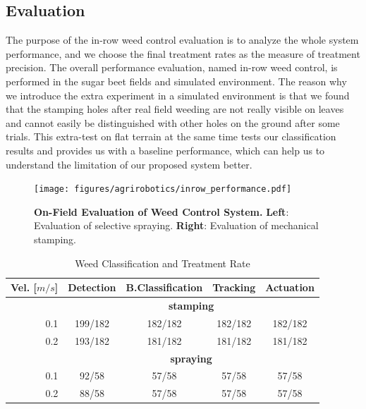 \subsection{Evaluation}

The purpose of the in-row weed control evaluation is to analyze the whole system performance, and we choose the final treatment rates as the measure of treatment precision. The overall performance evaluation, named in-row weed control, is performed in the sugar beet fields and simulated environment. The reason why we introduce the extra experiment in a simulated environment is that we found that the stamping holes after real field weeding are not really visible on leaves and cannot easily be distinguished with other holes on the ground after some trials. This extra-test on flat terrain at the same time tests our classification results and provides us with a baseline performance, which can help us to understand the limitation of our proposed system better.

\begin{figure}[t] 
	\centering
	\texttt{[image: figures/agrirobotics/inrow\_performance.pdf]}
    \caption[On-Field Evaluation of Weed Control System]{ \textbf{On-Field Evaluation of Weed Control System.} \textbf{Left}: Evaluation of selective spraying. \textbf{Right}: Evaluation of mechanical stamping. 
	\label{fig:agrirobotics_inrowperformance}}
\end{figure} 

\begin{table}[t]
	\centering
    \caption[Weed Classification and Treatment Rate]{ Weed Classification and Treatment Rate \label{tbl:agrirobotics_intrarow}}
	\begin{tabular}{rcccc}
\hline
Vel. [$m/s$] & Detection & B.Classification & Tracking & Actuation \\ \hline
             & \multicolumn{4}{c}{\textbf{stamping}}                        \\
0.1          & 199/182   & 182/182          & 182/182  & 182/182   \\
0.2          & 193/182   & 181/182          & 181/182  & 181/182   \\ \hline
             & \multicolumn{4}{c}{\textbf{spraying}}                        \\
0.1          & 92/58     & 57/58            & 57/58    & 57/58     \\
0.2          & 88/58     & 57/58            & 57/58    & 57/58     \\ \hline
	\end{tabular}
\end{table}

